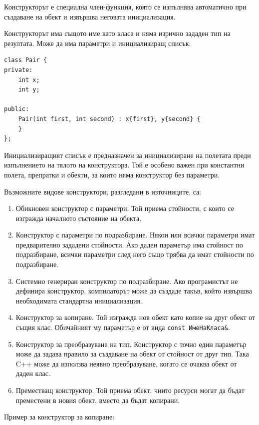 \begin{defn}
Конструкторът е специална член-функция, която се изпълнява автоматично при създаване на обект и извършва неговата инициализация.
\end{defn}

Конструкторът има същото име като класа и няма изрично зададен тип на резултата. Може да има параметри и инициализиращ списък:

\begin{verbatim}
class Pair {
private:
    int x;
    int y;

public:
    Pair(int first, int second) : x{first}, y{second} {
    }
};
\end{verbatim}

Инициализиращият списък е предназначен за инициализиране на полетата преди изпълнението на тялото на конструктора. Той е особено важен при константни полета, препратки и обекти, за които няма конструктор без параметри.

Възможните видове конструктори, разгледани в източниците, са:

\begin{enumerate}
    \item Обикновен конструктор с параметри. Той приема стойности, с които се изгражда началното състояние на обекта.
    \item Конструктор с параметри по подразбиране. Някои или всички параметри имат предварително зададени стойности. Ако даден параметър има стойност по подразбиране, всички параметри след него също трябва да имат стойности по подразбиране.
    \item Системно генериран конструктор по подразбиране. Ако програмистът не дефинира конструктор, компилаторът може да създаде такъв, който извършва необходимата стандартна инициализация.
    \item Конструктор за копиране. Той изгражда нов обект като копие на друг обект от същия клас. Обичайният му параметър е от вида \texttt{const ИмеНаКласа\&}.
    \item Конструктор за преобразуване на тип. Конструктор с точно един параметър може да задава правило за създаване на обект от стойност от друг тип. Така C++ може да използва неявно преобразуване, когато се очаква обект от даден клас.
    \item Преместващ конструктор. Той приема обект, чиито ресурси могат да бъдат преместени в новия обект, вместо да бъдат копирани.
\end{enumerate}

Пример за конструктор за копиране:

